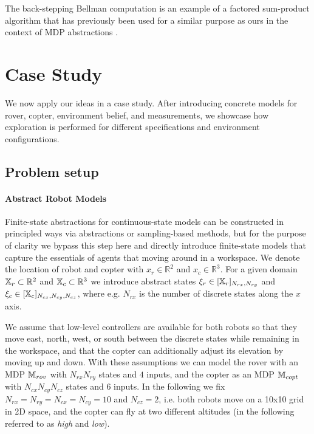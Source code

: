 \documentclass[conference]{IEEEtran}
\renewcommand{\cite}[1]{\citep{#1}}
\begin{document}
The back-stepping Bellman computation is an example of a factored sum-product algorithm \cite{Kschischang2001} that has previously been used for a similar purpose as ours in the context of MDP abstractions \cite{EsmaeilZadehSoudjani2017}.

 

\section{Case Study}
\label{sec:casestudy}

We now apply our ideas in a case study. After introducing concrete models for rover, copter, environment belief, and measurements, we showcase how exploration is performed for different specifications and environment configurations.

\subsection{Problem setup}

\paragraph{Abstract Robot Models}

Finite-state abstractions for continuous-state models can be constructed in principled ways via abstractions or sampling-based methods, but for the purpose of clarity we bypass this step here and directly introduce finite-state models that capture the essentials of agents that moving around in a workspace. We denote the location of robot and copter with $x_r \in \mathbb{R}^2$ and $x_c \in \mathbb{R}^3$. For a given domain $\mathbb{X}_r \subset \mathbb{R}^2$ and $\mathbb{X}_c \subset \mathbb{R}^3$ we introduce abstract states $\xi_r \in [\mathbb{X}_r]_{N_{rx}, N_{ry}}$ and $\xi_c \in [\mathbb{X}_c]_{N_{cx}, N_{cy}, N_{cz}}$, where e.g. $N_{rx}$ is the number of discrete states along the $x$ axis. 

We assume that low-level controllers are available for both robots so that they move east, north, west, or south between the discrete states while remaining in the workspace, and that the copter can additionally adjust its elevation by moving up and down. With these assumptions we can model the rover with an MDP $\mathbb{M}_{rov}$ with $N_{rx} N_{ry}$ states and $4$ inputs, and the copter as an MDP $\mathbb{M}_{copt}$ with $N_{cx} N_{cy} N_{cz}$ states and $6$ inputs. In the following we fix $N_{rx} = N_{ry} = N_{cx} = N_{cy} = 10$ and $N_{cz} = 2$, i.e. both robots move on a 10x10 grid in 2D space, and the copter can fly at two different altitudes (in the following referred to as \emph{high} and \emph{low}).
\end{document}
